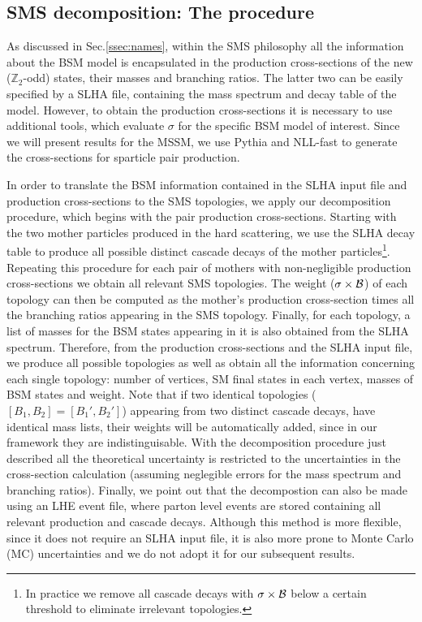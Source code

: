 \subsection{SMS decomposition: The procedure}
\label{ssec:decomp}


As discussed in Sec.\ref{ssec:names}, within the SMS philosophy all the information
about the BSM model is encapsulated in the production cross-sections of the new
($\mathbb{Z}_2$-odd) states, their masses and branching ratios.
The latter two can be easily specified by a SLHA file, containing the
mass spectrum and decay table of the model.
However, to obtain the production cross-sections it is necessary to use
additional tools, which evaluate $\sigma$ for the specific BSM model of interest.
Since we will present results for the MSSM, we use Pythia\cite{pythia} and NLL-fast\cite{NLLfast} to 
generate the cross-sections for sparticle pair production.


In order to translate the BSM information contained in the SLHA input file and production
cross-sections to the SMS topologies, we apply our decomposition procedure, which
begins with the pair production cross-sections. Starting with the two mother particles
produced in the hard scattering, we use the SLHA decay table to produce all possible distinct cascade decays of the 
mother particles\footnote{In practice we remove all cascade decays with $\mbox{\ensuremath{\sigma\times\mathcal{B}}}$ below a certain threshold
to eliminate irrelevant topologies.}. Repeating this procedure for each pair of mothers with non-negligible
production cross-sections we obtain all relevant SMS topologies.
The weight ($\mbox{\ensuremath{\sigma\times\mathcal{B}}}$) of each topology can then be computed as the mother's production cross-section times
all the branching ratios appearing in the SMS topology.
Finally, for each topology, a list of masses for the BSM states appearing in it is also obtained
from the SLHA spectrum. Therefore, from the production cross-sections and the SLHA input file,
we produce all possible topologies as well as obtain all the information concerning each
single topology: number of vertices, SM final states in each vertex, masses of BSM states and weight.
Note that if two identical topologies ($[B_1,B_2] = [B_1',B_2']$) appearing from two distinct cascade
decays, have identical mass lists, their weights will be automatically added, since in our framework they are indistinguisable.
With the decomposition procedure just described all the theoretical uncertainty is restricted to the
uncertainties in the cross-section calculation (assuming neglegible errors for the mass spectrum
and branching ratios). Finally, we point out that the decompostion can also be made using an LHE
event file, where parton level events are stored containing all relevant production and cascade decays.
Although this method is more flexible, since it does not require an SLHA input file,
it is also more prone to Monte Carlo (MC) uncertainties and we do not adopt it for our subsequent
results.


